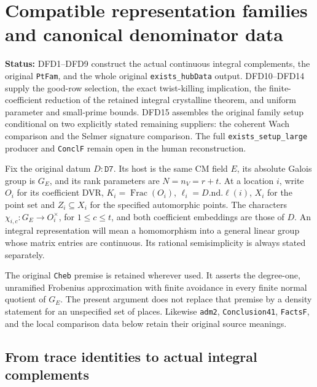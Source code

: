 \documentclass[11pt,a4paper]{article}
\numberwithin{equation}{section}
\theoremstyle{remark}\newtheorem{remark}[theorem]{Remark}
\newcommand{\status}[1]{\textbf{Status:} #1}
\begin{document}
\section{Compatible representation families and canonical denominator data}
\label{sec:denominator-family-v051}

\status{DFD1--DFD9 construct the actual continuous integral complements,
the original \texttt{Pt\allowbreak Fam}, and the whole original
\texttt{exists\_\allowbreak hub\allowbreak Data} output. DFD10--DFD14 supply the good-row
selection, the exact twist-killing implication, the finite-coefficient
reduction of the retained integral crystalline theorem, and uniform
parameter and small-prime bounds. DFD15 assembles the original family
setup conditional on two explicitly stated remaining suppliers: the
coherent Wach comparison and the Selmer signature comparison. The full
\texttt{exists\_\allowbreak setup\_\allowbreak large} producer and \texttt{Concl\allowbreak F} remain open in
the human reconstruction.}

Fix the original datum $D:\texttt{D7}$. Its host is the same CM field
$E$, its absolute Galois group is $G_E$, and its rank parameters are
$N=n_V=r+t$. At a location $i$, write $O_i$ for its coefficient DVR,
$K_i=\operatorname{Frac}(O_i)$, $\ell_i=D.\mathrm{nd}.\ell(i)$,
$X_i$ for the point set and $Z_i\subseteq X_i$ for the specified
automorphic points. The characters $\chi_{i,c}:G_E\to O_i^\times$,
for $1\le c\le t$, and both coefficient embeddings are those of $D$.
An integral representation will mean a homomorphism into a general
linear group whose matrix entries are continuous. Its rational
semisimplicity is always stated separately.

The original \texttt{Cheb} premise is retained wherever used. It
asserts the degree-one, unramified Frobenius approximation with finite
avoidance in every finite normal quotient of $G_E$. The present
argument does not replace that premise by a density statement for an
unspecified set of places. Likewise \texttt{adm2},
\texttt{Conclusion41}, \texttt{Facts\allowbreak F}, and the local comparison data
below retain their original source meanings.

\subsection{From trace identities to actual integral complements}

\end{document}
